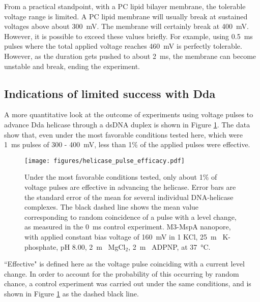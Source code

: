 From a practical standpoint, with a PC lipid bilayer membrane, the tolerable voltage range is limited.  A PC lipid membrane will usually break at sustained voltages above about \SI{300}{\mV}.  The membrane will certainly break at \SI{400}{\mV}.  However, it is possible to exceed these values briefly.  For example, using \SI{0.5}{\ms} pulses where the total applied voltage reaches \SI{460}{\mV} is perfectly tolerable.  However, as the duration gets pushed to about \SI{2}{\ms}, the membrane can become unstable and break, ending the experiment.

\subsection{Indications of limited success with Dda}

A more quantitative look at the outcome of experiments using voltage pulses to advance Dda helicase through a dsDNA duplex is shown in Figure \ref{fig:helicase_pulse_efficacy}.  The data show that, even under the most favorable conditions tested here, which were \SI{1}{\ms} pulses of \num{300} - \SI{400}{\mV}, less than \num{1}\% of the applied pulses were effective.

\begin{figure}[h]
\begin{centering}
\texttt{[image: figures/helicase\_pulse\_efficacy.pdf]}
\caption[Quantifying efficacy of pulses]{Under the most favorable conditions tested, only about 1\% of voltage pulses are effective in advancing the helicase.  Error bars are the standard error of the mean for several individual DNA-helicase complexes.  The black dashed line shows the mean value corresponding to random coincidence of a pulse with a level change, as measured in the \SI{0}{\ms} control experiment.  M3-MspA nanopore, with applied constant bias voltage of \SI{160}{\mV} in \SI{1}{\Molar} KCl, \SI{25}{\m\Molar} K-phosphate, pH \num{8.00}, \SI{2}{\m\Molar} MgCl$_2$, \SI{2}{\m\Molar} ADPNP, at \SI{37}{\celsius}.}
\label{fig:helicase_pulse_efficacy}
\end{centering}
\end{figure}

``Effective" is defined here as the voltage pulse coinciding with a current level change.  In order to account for the probability of this occurring by random chance, a control experiment was carried out under the same conditions, and is shown in Figure \ref{fig:helicase_pulse_efficacy} as the dashed black line.

